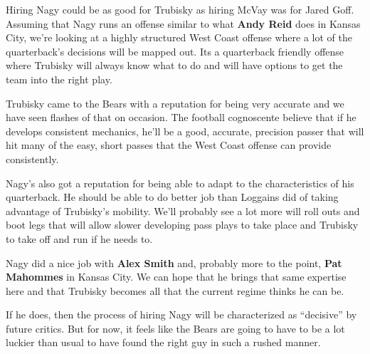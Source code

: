 \documentclass[11pt]{article}
\begin{document}
Hiring Nagy could be as good for
Trubisky as hiring McVay was for Jared Goff.  Assuming that Nagy runs
an offense similar to what \textbf{Andy Reid} does in Kansas City, we're
looking at a highly structured West Coast offense where a lot of the
quarterback's decisions will be mapped out.  Its a quarterback
friendly offense where Trubisky will always know what to do and will
have options to get the team into the right play.

Trubisky came to the Bears with a reputation for being very accurate
and we have seen flashes of that on occasion.  The football cognoscente
believe that if he develops consistent mechanics, he'll be a good,
accurate, precision passer that will hit many of the easy, short
passes that the West Coast offense can provide consistently.

Nagy's also got a reputation for being able to adapt to the
characteristics of his quarterback.  He should be able to do better
job than Loggains did of taking advantage of Trubisky's mobility.
We'll probably see a lot more will roll outs and boot legs that will
allow slower developing pass plays to take place and Trubisky to take
off and run if he needs to.

Nagy did a nice job with \textbf{Alex Smith} and, probably more to the
point, \textbf{Pat Mahommes} in Kansas City. We can hope that he
brings that same expertise here and that Trubisky becomes all that the
current regime thinks he can be.

If he does, then the process of hiring Nagy will be characterized as
``decisive'' by future critics.  But for now, it feels like the Bears
are going to have to be a lot luckier than usual to have found the
right guy in such a rushed manner.

\end{document}
